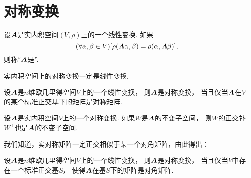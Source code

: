 \section{对称变换}
\begin{definition}
设\(\boldsymbol{A}\)是实内积空间\((V,\rho)\)上的一个线性变换.
如果\begin{equation*}
	(\forall \alpha,\beta \in V)
	[
		\rho(\boldsymbol{A}\alpha,\beta)
		= \rho(\alpha,\boldsymbol{A}\beta)
	],
\end{equation*}
则称“\(\boldsymbol{A}\)是”.
\end{definition}

\begin{proposition}
实内积空间上的对称变换一定是线性变换.
\end{proposition}

\begin{proposition}
设\(\boldsymbol{A}\)是\(n\)维欧几里得空间\(V\)上的一个线性变换，
则\(\boldsymbol{A}\)是对称变换，
当且仅当\(\boldsymbol{A}\)在\(V\)的某个标准正交基下的矩阵是对称矩阵.
\end{proposition}

\begin{proposition}
设\(\boldsymbol{A}\)是实内积空间\(V\)上的一个对称变换.
如果\(W\)是\(\boldsymbol{A}\)的不变子空间，
则\(W\)的正交补\(W^\perp\)也是\(\boldsymbol{A}\)的不变子空间.
\end{proposition}

我们知道，实对称矩阵一定正交相似于某一个对角矩阵，由此得出：
\begin{theorem}
设\(\boldsymbol{A}\)是\(n\)维欧几里得空间\(V\)上的一个线性变换，
则\(\boldsymbol{A}\)是对称变换，
当且仅当\(V\)中存在一个标准正交基\(S\)，
使得\(\boldsymbol{A}\)在基\(S\)下的矩阵是对角矩阵.
\end{theorem}
